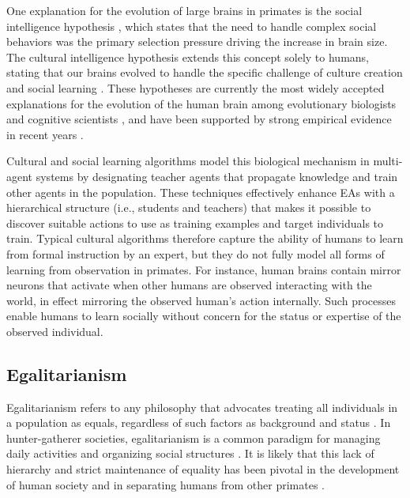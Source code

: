 \documentclass{sig-alternate}
\begin{document}
One explanation for the evolution of large brains in primates is the social intelligence hypothesis \cite{byrne1989machiavellian, humphrey1976social}, which states that the need to handle complex social behaviors was the primary selection pressure driving the increase in brain size. The cultural intelligence hypothesis extends this concept solely to humans, stating that our brains evolved to handle the specific challenge of culture creation and social learning \cite{tomasello1999cultural}. These hypotheses are currently the most widely accepted explanations for the evolution of the human brain among evolutionary biologists and cognitive scientists \cite{holekamp2007questioning}, and have been supported by strong empirical evidence in recent years \cite{herrmann2007humans}.  

Cultural and social learning algorithms \cite{reynolds1994introduction} model this biological mechanism in multi-agent systems by designating teacher agents that propagate knowledge and train other agents in the population. These techniques effectively enhance EAs with a hierarchical structure (i.e., students and teachers) that makes it possible to discover suitable actions to use as training examples and target individuals to train. Typical cultural algorithms therefore capture the ability of humans to learn from formal instruction by an expert, but they do not fully model all forms of learning from observation in primates. For instance, human brains contain mirror neurons \cite{gallese-98} that activate when other humans are observed interacting with the world, in effect mirroring the observed human's action internally. Such processes enable humans to learn socially without concern for the status or expertise of the observed individual.

\subsection{Egalitarianism}

Egalitarianism refers to any philosophy that advocates treating all individuals in a population as equals, regardless of such factors as background and status \cite{sep2009egalitarianism}. In hunter-gatherer societies, egalitarianism is a common paradigm for managing daily activities and organizing social structures \cite{boehm2001hierarchy}. It is likely that this lack of hierarchy and strict maintenance of equality has been pivotal in the development of human society and in separating humans from other primates \cite{erda1996egalitarianism}. 
\end{document}
